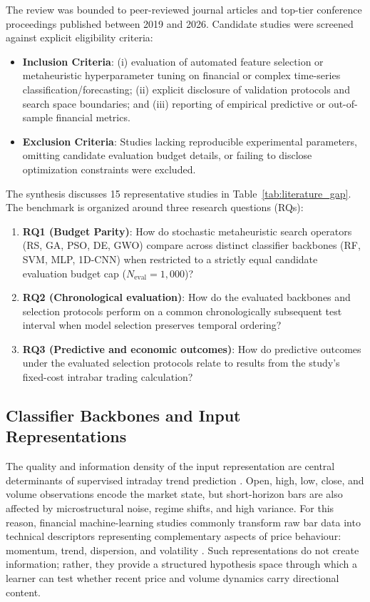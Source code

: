 The review was bounded to peer-reviewed journal articles and top-tier conference proceedings published between 2019 and 2026. Candidate studies were screened against explicit eligibility criteria:
\begin{itemize}
    \item \textbf{Inclusion Criteria}: (i) evaluation of automated feature selection or metaheuristic hyperparameter tuning on financial or complex time-series classification/forecasting; (ii) explicit disclosure of validation protocols and search space boundaries; and (iii) reporting of empirical predictive or out-of-sample financial metrics.
    \item \textbf{Exclusion Criteria}: Studies lacking reproducible experimental parameters, omitting candidate evaluation budget details, or failing to disclose optimization constraints were excluded.
\end{itemize}

The synthesis discusses 15 representative studies in Table~\ref{tab:literature_gap}. The benchmark is organized around three research questions (RQs):
\begin{enumerate}
    \item \textbf{RQ1 (Budget Parity)}: How do stochastic metaheuristic search operators (RS, GA, PSO, DE, GWO) compare across distinct classifier backbones (RF, SVM, MLP, 1D-CNN) when restricted to a strictly equal candidate evaluation budget cap ($N_{\mathrm{eval}} = 1{,}000$)?
    \item \textbf{RQ2 (Chronological evaluation)}: How do the evaluated backbones and selection protocols perform on a common chronologically subsequent test interval when model selection preserves temporal ordering?
    \item \textbf{RQ3 (Predictive and economic outcomes)}: How do predictive outcomes under the evaluated selection protocols relate to results from the study’s fixed-cost intrabar trading calculation?
\end{enumerate}




\FloatBarrier

\subsection{Classifier Backbones and Input Representations}\label{subsec:backbones_features}

The quality and information density of the input representation are central determinants of supervised intraday trend prediction \cite{singh2022feature}. Open, high, low, close, and volume observations encode the market state, but short-horizon bars are also affected by microstructural noise, regime shifts, and high variance. For this reason, financial machine-learning studies commonly transform raw bar data into technical descriptors representing complementary aspects of price behaviour: momentum, trend, dispersion, and volatility \cite{billah2024nca_moving_average, hunter1986exponentially, bollinger1992using}. Such representations do not create information; rather, they provide a structured hypothesis space through which a learner can test whether recent price and volume dynamics carry directional content.

